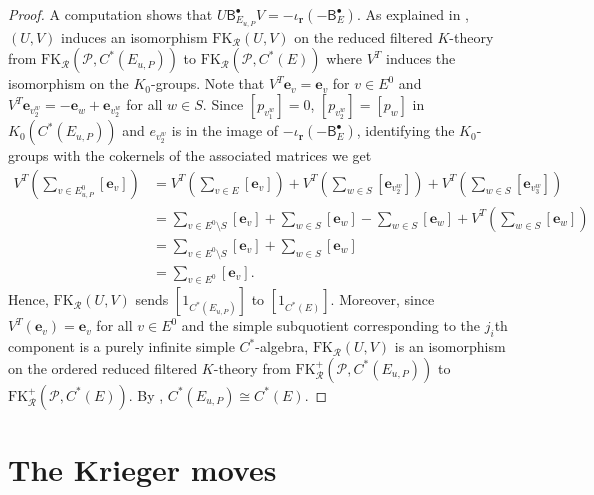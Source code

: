 \documentclass[12pt]{amsbook}%
\newcommand{\ee}{{\mathbf e}}
\theoremstyle{defin}
\theoremstyle{remark}
\numberwithin{equation}{chapter}
\numberwithin{theor}{section}
\begin{document}
\begin{proof}
A computation shows that $U \mathsf{B}_{E_{u, P}}^\bullet V = - \iota_{\mathbf{r}} ( - \mathsf{B}_E^\bullet )$.  As explained in \cite[Section~4.4]{segrerapws:gcgcfg}, $(U,V)$ induces an isomorphism $\mathrm{FK}_{\mathcal{R}}(U,V)$ on the reduced filtered $K$-theory from $\mathrm{FK}_{ \mathcal{R} } ( \mathcal{P} , C^*( E_{ u, P } ) )$ to $\mathrm{FK}_{ \mathcal{R} } ( \mathcal{P} , C^*( E ) )$ where $V^T$ induces the isomorphism on the $K_0$-groups. %
Note that $V^T\ee_v=\ee_v$ for $v\in E^0$ and $V^T\ee_{v_2^w}=-\ee_w+\ee_{v_2^w}$ for all $w\in S$. Since $[p_{v^w_1}]=0$, $[p_{v^w_2}]=[p_w]$ in $K_0(C^*(E_{u,P}))$ and $e_{v^w_2}$ is in the image of $-\iota_{\mathbf r}(-\mathsf{B}_E^\bullet)$, identifying the $K_0$-groups with the cokernels of the associated matrices we get 
\begin{align*}
V^T\left( \sum_{v \in E_{u , P}^0} [\ee_v] \right) &= V^T \left( \sum_{v \in E } [\ee_v] \right) + V^T\left( \sum_{w \in S } [\ee_{v^w_2}] \right) + V^T \left( \sum_{w \in S } [\ee_{v^w_3}] \right) \\
					& = \sum_{ v \in E^0 \setminus S } [\ee_v] + \sum_{w \in S} [\ee_{w}] - \sum_{w \in S }  [\ee_{w}] + V^T \left(\sum_{ w \in S } [\ee_w] \right) \\
					&=  \sum_{ v \in E^0 \setminus S} [\ee_v] + \sum_{w \in S } [\ee_w] \\
					&= \sum_{v \in E^0} [\ee_v]. 
\end{align*}
Hence, $\mathrm{FK}_{\mathcal{R}}(U,V)$ sends $[ 1_{C^*(E_{u, P})} ]$ to $[ 1_{C^*(E) } ]$.  Moreover, since $V^T ( \ee_v ) = \ee_v$ for all $v \in E^0$ and the simple subquotient corresponding to the $j_i$th component is a purely infinite simple $C^*$-algebra, $\mathrm{FK}_{\mathcal{R}}(U,V)$ is an isomorphism on the ordered reduced filtered $K$-theory from $\mathrm{FK}_{ \mathcal{R} }^+ ( \mathcal{P} , C^*( E_{ u, P } ) )$ to $\mathrm{FK}_{ \mathcal{R} }^+ ( \mathcal{P} , C^*( E ) )$.  By \cite[Theorem~3.5]{segrerapws:ccuggs}, $C^*(E_{u,P}) \cong C^*(E)$.
\end{proof}

\chapter{The Krieger moves}
\end{document}
